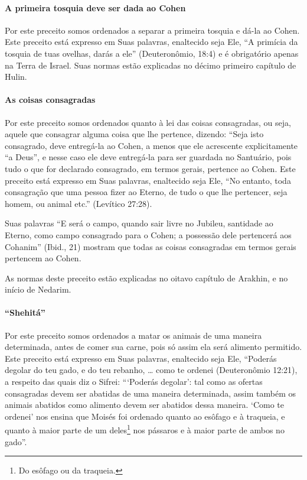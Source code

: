 \paragraph{A primeira tosquia deve ser dada ao Cohen}

Por este preceito somos ordenados a separar a primeira tosquia e dá-la
ao Cohen. Este preceito está expresso em Suas palavras, enaltecido
seja Ele, ``A primícia da tosquia de tuas ovelhas, darás a ele''
(Deuteronômio, 18:4) e é obrigatório apenas na Terra de Israel. Suas
normas estão explicadas no décimo primeiro capítulo de Hulin.

\paragraph{As coisas consagradas}

Por este preceito somos ordenados quanto à lei das coisas consagradas,
ou seja, aquele que consagrar alguma coisa que lhe pertence, dizendo:
``Seja isto consagrado, deve entregá-la ao Cohen, a menos que ele
acrescente explicitamente ``a Deus'', e nesse caso ele deve entregá-la
para ser guardada no Santuário, pois tudo o que for declarado
consagrado, em termos gerais, pertence ao Cohen. Este preceito está
expresso em Suas palavras, enaltecido seja Ele, ``No entanto, toda
consagração que uma pessoa fizer ao Eterno, de tudo o que lhe pertencer,
seja homem, ou animal etc.'' (Levítico 27:28).

Suas palavras ``E será o campo, quando sair livre no Jubileu, santidade
ao Eterno, como campo consagrado para o Cohen; a possessão dele
pertencerá aos Cohanim'' (Ibid., 21) mostram que todas as coisas
consagradas em termos gerais pertencem ao Cohen.

As normas deste preceito estão explicadas no oitavo capítulo de
Arakhin, e no início de Nedarim.

\paragraph{``Shehitá''}

Por este preceito somos ordenados a matar os animais de uma maneira
determinada, antes de comer sua carne, pois só assim ela será alimento
permitido. Este preceito está expresso em Suas palavras, enaltecido seja
Ele, ``Poderás degolar do teu gado, e do teu rebanho, \ldots{} como te
ordenei (Deuteronômio 12:21), a respeito das quais diz o Sifrei:
```Poderás degolar': tal como as ofertas consagradas devem ser abatidas
de uma maneira determinada, assim também os animais abatidos como
alimento devem ser abatidos dessa maneira. `Como te ordenei' nos ensina
que Moisés foi ordenado quanto ao esôfago e à traqueia, e quanto à maior
parte de um deles\footnote{Do esôfago ou da traqueia.} nos pássaros e à maior parte de
ambos no gado''.

